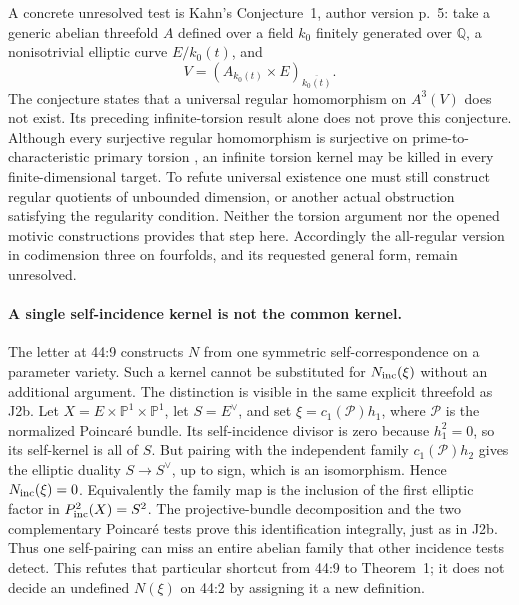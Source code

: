 A concrete unresolved test is Kahn's Conjecture~1, author version
p.~5: take a generic abelian threefold $A$ defined over a field
$k_0$ finitely generated over $\mathbb Q$, a nonisotrivial elliptic
curve $E/k_0(t)$, and
\[
 V=(A_{k_0(t)}\times E)_{\overline{k_0(t)}}.
\]
The conjecture states that a universal regular homomorphism on
$A^3(V)$ does not exist. Its preceding infinite-torsion result
alone does not prove this conjecture. Although every surjective
regular homomorphism is surjective on prime-to-characteristic
primary torsion \cite[Remark 2, p.~4]{DGJ_Kahn2021}, an infinite
torsion kernel may be killed in every finite-dimensional target.
To refute universal existence one must still construct regular
quotients of unbounded dimension, or another actual obstruction
satisfying the regularity condition. Neither the torsion argument
nor the opened motivic constructions provides that step here.
Accordingly the all-regular version in codimension three on
fourfolds, and its requested general form, remain unresolved.

\paragraph{A single self-incidence kernel is not the common kernel.}
The letter at 44:9 constructs $N$ from one symmetric
self-correspondence on a parameter variety. Such a kernel cannot
be substituted for $N_{\rm inc}(\xi)$ without an additional
argument. The distinction is visible in the same explicit
threefold as J2b. Let $X=E\times\mathbb P^1\times\mathbb P^1$,
let $S=E^\vee$, and set $\xi=c_1(\mathcal P)h_1$, where
$\mathcal P$ is the normalized Poincaré bundle. Its
self-incidence divisor is zero because $h_1^2=0$, so its
self-kernel is all of $S$. But pairing with the independent
family $c_1(\mathcal P)h_2$ gives the elliptic duality
$S\to S^\vee$, up to sign, which is an isomorphism. Hence
$N_{\rm inc}(\xi)=0$. Equivalently the family map is the
inclusion of the first elliptic factor in $P^2_{\rm inc}(X)=S^2$.
The projective-bundle decomposition and the two complementary
Poincaré tests prove this identification integrally, just as in
J2b. Thus one self-pairing can miss an entire abelian family that
other incidence tests detect. This refutes that particular
shortcut from 44:9 to Theorem~1; it does not decide an undefined
$N(\xi)$ on 44:2 by assigning it a new definition.

